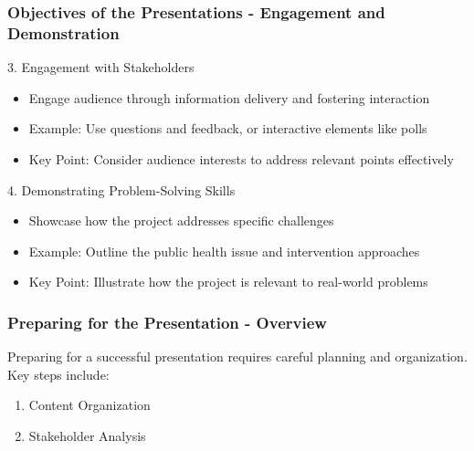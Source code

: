 \documentclass{beamer}
\begin{document}
\begin{frame}[fragile]
    \frametitle{Objectives of the Presentations - Engagement and Demonstration}
    \begin{block}{3. Engagement with Stakeholders}
        \begin{itemize}
            \item Engage audience through information delivery and fostering interaction
            \item Example: Use questions and feedback, or interactive elements like polls
            \item Key Point: Consider audience interests to address relevant points effectively
        \end{itemize}
    \end{block}

    \begin{block}{4. Demonstrating Problem-Solving Skills}
        \begin{itemize}
            \item Showcase how the project addresses specific challenges
            \item Example: Outline the public health issue and intervention approaches
            \item Key Point: Illustrate how the project is relevant to real-world problems
        \end{itemize}
    \end{block}
\end{frame}

\begin{frame}[fragile]
    \frametitle{Preparing for the Presentation - Overview}
    Preparing for a successful presentation requires careful planning and organization. Key steps include:
    \begin{enumerate}
        \item Content Organization
        \item Stakeholder Analysis
    \end{enumerate}
\end{frame}
\end{document}
